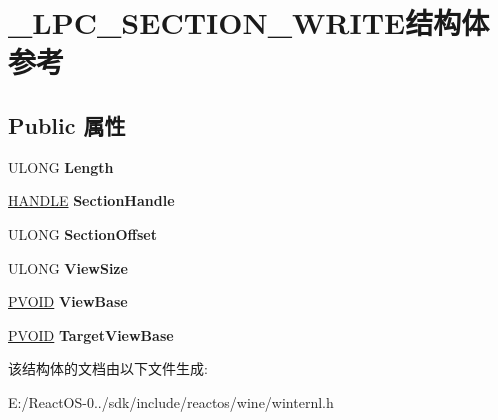 \hypertarget{struct___l_p_c___s_e_c_t_i_o_n___w_r_i_t_e}{}\section{\+\_\+\+L\+P\+C\+\_\+\+S\+E\+C\+T\+I\+O\+N\+\_\+\+W\+R\+I\+T\+E结构体 参考}
\label{struct___l_p_c___s_e_c_t_i_o_n___w_r_i_t_e}
\subsection*{Public 属性}
\begin{DoxyCompactItemize}
\item 
\mbox{\label{struct___l_p_c___s_e_c_t_i_o_n___w_r_i_t_e_a75e766ac6858d48535bdc572d82cd82a}} 
U\+L\+O\+NG {\bfseries Length}
\item 
\mbox{\label{struct___l_p_c___s_e_c_t_i_o_n___w_r_i_t_e_a382b5c9c61d63397c9a6302e31cc2585}} 
\hyperlink{interfacevoid}{H\+A\+N\+D\+LE} {\bfseries Section\+Handle}
\item 
\mbox{\label{struct___l_p_c___s_e_c_t_i_o_n___w_r_i_t_e_ae4cc71f7571bce96c52a9a94e1bfb594}} 
U\+L\+O\+NG {\bfseries Section\+Offset}
\item 
\mbox{\label{struct___l_p_c___s_e_c_t_i_o_n___w_r_i_t_e_a4699782d1dec223c120d1d0ade599952}} 
U\+L\+O\+NG {\bfseries View\+Size}
\item 
\mbox{\label{struct___l_p_c___s_e_c_t_i_o_n___w_r_i_t_e_a460bb7c3cb5bef06f73fff124279031e}} 
\hyperlink{interfacevoid}{P\+V\+O\+ID} {\bfseries View\+Base}
\item 
\mbox{\label{struct___l_p_c___s_e_c_t_i_o_n___w_r_i_t_e_aef3e278c6501ff1bd0eb9578307c3d06}} 
\hyperlink{interfacevoid}{P\+V\+O\+ID} {\bfseries Target\+View\+Base}
\end{DoxyCompactItemize}


该结构体的文档由以下文件生成\+:\begin{DoxyCompactItemize}
\item 
E\+:/\+React\+O\+S-\/0../sdk/include/reactos/wine/winternl.\+h\end{DoxyCompactItemize}
